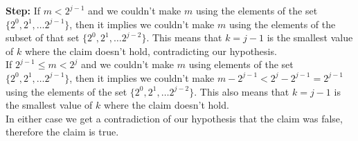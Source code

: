 \documentclass[11pt,fleqn]{article}
\begin{document}
\begin{enumerate}
\textbf{Step:} If $m < 2^{j-1}$ and we couldn't make $m$ using the elements of the set $\{2^0,2^1,\ldots 2^{j-1}\}$, then it implies we couldn't make $m$ using the elements of the subset of that set $\{2^0,2^1,\ldots 2^{j-2}\}$. This means that $k=j-1$ is the smallest value of $k$ where the claim doesn't hold, contradicting our hypothesis. \\ If $2^{j-1} \leq m < 2^j$ and we couldn't make $m$ using elements of the set $\{2^0,2^1,\ldots 2^{j-1}\}$, then it implies we couldn't make $m-2^{j-1} < 2^j - 2^{j-1} = 2^{j-1}$ using the elements of the set $\{2^0,2^1,\ldots 2^{j-2}\}$. This also means that $k=j-1$ is the smallest value of $k$ where the claim doesn't hold. \\ In either case we get a contradiction of our hypothesis that the claim was false, therefore the claim is true.

\end{enumerate}
\end{document}
